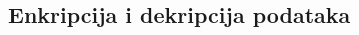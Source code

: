 \documentclass[a4paper,oneside,12pt]{memoir} %
\begin{document}
\begin{spacing}{1.5}
\section{Enkripcija i dekripcija podataka}

\newpage
\nocite{*}


\end{spacing}
\end{document}
